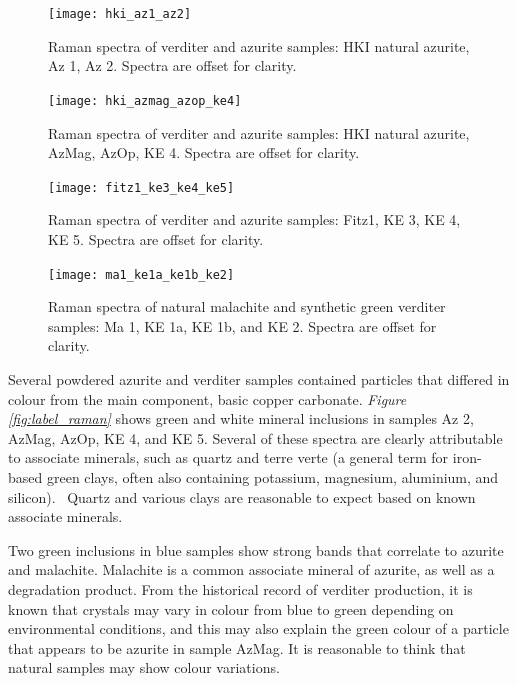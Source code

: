 \begin{figure}[H]
\centering
  \texttt{[image: hki\_az1\_az2]}
\caption[Raman spectra of blue samples.]{Raman spectra of verditer and azurite samples: HKI natural azurite, Az 1, Az 2. Spectra are offset for clarity.}
\label{fig:blue_comparison1}
\end{figure}

\begin{figure}[H]
  \centering
  \texttt{[image: hki\_azmag\_azop\_ke4]}
\caption[Raman spectra of blue samples.]{Raman spectra of verditer and azurite samples: HKI natural azurite, AzMag, AzOp, KE 4. Spectra are offset for clarity.}
\label{fig:blue_comparison2}
\end{figure}

\begin{figure}[H]
  \centering
  \texttt{[image: fitz1\_ke3\_ke4\_ke5]}
\caption[Raman spectra of blue samples.]{Raman spectra of verditer and azurite samples: Fitz1, KE 3, KE 4, KE 5. Spectra are offset for clarity.}
\label{fig:blue_comparison3}
\end{figure}

\begin{figure}[H]
\centering
  \texttt{[image: ma1\_ke1a\_ke1b\_ke2]}
\caption[Raman spectra of green samples.]{Raman spectra of natural malachite and synthetic green verditer samples: Ma 1, KE 1a, KE 1b, and KE 2. Spectra are offset for clarity.}
\label{fig:green_comparison}
\end{figure}

Several powdered azurite and verditer samples contained particles that differed in colour from the main component, basic copper carbonate. \textit{Figure \ref{fig:label_raman}} shows green and white mineral inclusions in samples Az 2, AzMag, AzOp, KE 4, and KE 5. Several of these spectra are clearly attributable to associate minerals, such as quartz and terre verte (a general term for iron-based green clays, often also containing potassium, magnesium, aluminium, and silicon).~\autocite{ucl_database,cameo_mfa,irug_quartz} Quartz and various clays are reasonable to expect based on known associate minerals.

Two green inclusions in blue samples show strong bands that correlate to azurite and malachite. Malachite is a common associate mineral of azurite, as well as a degradation product. From the historical record of verditer production, it is known that crystals may vary in colour from blue to green depending on environmental conditions, and this may also explain the green colour of a particle that appears to be azurite in sample AzMag. It is reasonable to think that natural samples may show colour variations. 

